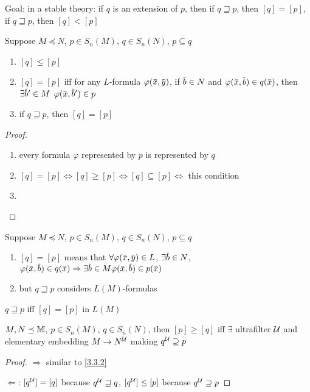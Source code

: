 \documentclass[11pt]{article}
\begin{document}
Goal: in a stable theory: if \(q\) is an extension of \(p\), then if \(q\sqsupseteq p\), then \([q]=[p]\),
if \(q\sqsupseteq p\), then \([q]<[p]\)

\begin{proposition}[]
\label{3.31.5}
Suppose \(M\preceq N\), \(p\in S_n(M)\), \(q\in S_n(N)\), \(p\subseteq q\)
\begin{enumerate}
\item \([q]\le[p]\)
\item \([q]=[p]\) iff for any \(L\)-formula \(\varphi(\barx,\bary)\), if \(\barb\in N\)
and \(\varphi(\barx,\barb)\in q(\barx)\), then \(\exists\barb'\in M\) \(\varphi(\barx,\barb')\in p\)
\item if \(q\sqsupseteq p\), then \([q]=[p]\)
\end{enumerate}
\end{proposition}

\begin{proof}
\begin{enumerate}
\item every formula \(\varphi\) represented by \(p\) is represented by \(q\)
\item \([q]=[p]\Leftrightarrow[q]\ge[p]\Leftrightarrow[q]\subseteq[p]\Leftrightarrow\) this condition
\item 
\end{enumerate}
\end{proof}

\begin{remark}
Suppose \(M\preceq N\), \(p\in S_n(M)\), \(q\in S_n(N)\), \(p\subseteq q\)
\begin{enumerate}
\item \([q]=[p]\)  means
that
\(\forall\varphi(\barx,\bary)\in L\),
\(\exists\barb\in N\), \(\varphi(\barx,\barb)\in q(\barx)\Rightarrow \exists\barb\in M\varphi(\barx,\barb)\in p(\barx)\)
\item but \(q\sqsupseteq p\) considers \(L(M)\)-formulas
\end{enumerate}


\(q\sqsupseteq p\) iff \([q]=[p]\) in \(L(M)\)
\end{remark}

\begin{proposition}[]
\(M,N\preceq\mathbb{M}\), \(p\in S_n(M)\), \(q\in S_n(N)\), then \([p]\ge[q]\) iff \(\exists\) ultrafilter \(\mathcal{U}\) and
elementary embedding \(M\to N^{\mathcal{U}}\) making \(q^{\mathcal{U}}\supseteq p\)
\end{proposition}

\begin{proof}
\(\Rightarrow\) similar to \ref{3.3.2}

\(\Leftarrow\): \([q^{\mathcal{U}}]=[q]\) because \(q^{\mathcal{U}}\sqsupseteq q\), \([q^{\mathcal{U}}]\le[p]\) because \(q^{\mathcal{U}}\supseteq p\)
\end{proof}
\end{document}
